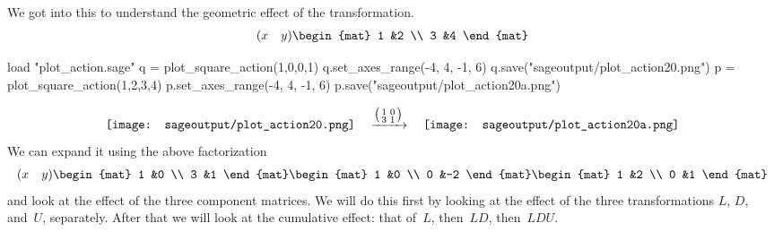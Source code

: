 We got into this to understand the geometric effect of the transformation.
\begin{equation*}
  \rowvec{x &y}
  \begin{mat}
   1 &2 \\
   3 &4 
  \end{mat}
\end{equation*}
\begin{sageoutput}[d,0,4;d,5,7]
load "plot_action.sage"
q = plot_square_action(1,0,0,1) 
q.set_axes_range(-4, 4, -1, 6) 
q.save("sageoutput/plot_action20.png")
p = plot_square_action(1,2,3,4) 
p.set_axes_range(-4, 4, -1, 6) 
p.save("sageoutput/plot_action20a.png")
\end{sageoutput}
\begin{equation*}
  \vcenteredhbox{\texttt{[image: sageoutput/plot\_action20.png]}}
  \quad\mapsvia{\big (\begin{smallmatrix} 1 &0 \\ 3 &1 \end{smallmatrix}\big )}\quad
  \vcenteredhbox{\texttt{[image: sageoutput/plot\_action20a.png]}}
\end{equation*}
\noindent We can expand it using the above factorization 
\begin{equation*}
  \rowvec{x &y}
  \begin{mat}
   1 &0 \\
   3 &1 
  \end{mat}
  \begin{mat}
    1 &0 \\
    0 &-2
  \end{mat}
  \begin{mat}
    1 &2 \\
    0 &1
  \end{mat}  
\end{equation*}
and look at the effect of the three component matrices.
We will do this first by looking at the effect of the three transformations
$L$, $D$, and~$U$, separately.
After that we will look at the cumulative effect: that of~$L$, then~$LD$, 
then~$LDU$.

